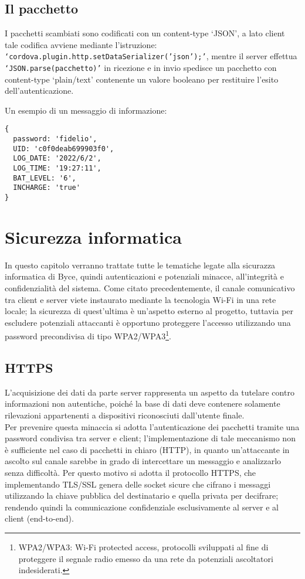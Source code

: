 \documentclass[target=bach]{thud}
\begin{document}
\section{Il pacchetto}
    I pacchetti scambiati sono codificati con un content-type `JSON', a lato client tale codifica avviene mediante l'istruzione: \texttt{`cordova.plugin.http.setDataSerializer('json');'}, mentre il server effettua \texttt{`JSON.parse(pacchetto)'} in ricezione e in invio spedisce un pacchetto con content-type `plain/text' contenente un valore booleano per restituire l'esito dell'autenticazione.

    Un esempio di un messaggio di informazione:
\begin{lstlisting}
{
  password: 'fidelio',
  UID: 'c0f0deab699903f0',
  LOG_DATE: '2022/6/2',
  LOG_TIME: '19:27:11',
  BAT_LEVEL: '6',
  INCHARGE: 'true'
}
\end{lstlisting}


\chapter{Sicurezza informatica}
In questo capitolo verranno trattate tutte le tematiche legate alla sicurazza informatica di Byce, quindi autenticazioni e potenziali minacce, all'integrità e confidenzialità del sistema.
Come citato precedentemente, il canale comunicativo tra client e server viete instaurato mediante la tecnologia Wi-Fi in una rete locale; la sicurezza di quest'ultima è un'aspetto esterno al progetto, tuttavia per escludere potenziali attaccanti è opportuno proteggere l'accesso utilizzando una password precondivisa di tipo WPA2/WPA3\footnote[1]{WPA2/WPA3: Wi-Fi protected access, protocolli sviluppati al fine di proteggere il segnale radio emesso da una rete da potenziali ascoltatori indesiderati.}.

\section{HTTPS}
    L'acquisizione dei dati da parte server rappresenta un aspetto da tutelare contro informazioni non autentiche, poiché la base di dati deve contenere solamente rilevazioni appartenenti a dispositivi riconosciuti dall'utente finale.\\
    Per prevenire questa minaccia si adotta l'autenticazione dei pacchetti tramite una password condivisa tra server e client; l'implementazione di tale meccanismo non è sufficiente nel caso di pacchetti in chiaro (HTTP), in quanto un'attaccante in ascolto sul canale sarebbe in grado di intercettare un messaggio e analizzarlo senza difficoltà. Per questo motivo si adotta il protocollo HTTPS, che implementando TLS/SSL genera delle socket sicure che cifrano i messaggi utilizzando la chiave pubblica del destinatario e quella privata per decifrare; rendendo quindi la comunicazione confidenziale esclusivamente al server e al client (end-to-end).
\end{document}
